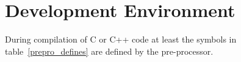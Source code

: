 
\chapter{Development Environment}

During compilation of C or C++ code at least the symbols in
table~\ref{prepro_defines} are defined by the pre-processor.

\begin{table}[H]
\Hrule
\caption{Predefined Pre-Processor Symbols}
\label{prepro_defines}
  \begin{center}\small{}\end{center}
\Hrule
\end{table}

